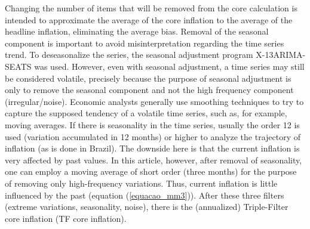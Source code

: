 \documentclass[10pt]{article}
\begin{document}
Changing the number of items that will be removed from the core calculation is intended to approximate the average of the core inflation to the average of the headline inflation, eliminating the average bias. Removal of the seasonal component is important to avoid misinterpretation regarding the time series trend. To deseasonalize the series, the seasonal adjustment program X-13ARIMA-SEATS \citep{x13} was used. However, even with seasonal adjustment, a time series may still be considered volatile, precisely because the purpose of seasonal adjustment is only to remove the seasonal component and not the high frequency component (irregular/noise). Economic analysts generally use smoothing techniques to try to capture the supposed tendency of a volatile time series, such as, for example, moving averages. If there is seasonality in the time series, usually the order 12 is used (variation accumulated in 12 months) or higher to analyze the trajectory of inflation (as is done in Brazil). The downside here is that the current inflation is very affected by past values. In this article, however, after removal of seasonality, one can employ a moving average of short order (three months) for the purpose of removing only high-frequency variations. Thus, current  inflation is little influenced by the past  (equation (\ref{equacao_mm3})). After these three filters (extreme variations, seasonality, noise), there is the (annualized) Triple-Filter core inflation (TF core inflation).

\end{document}
